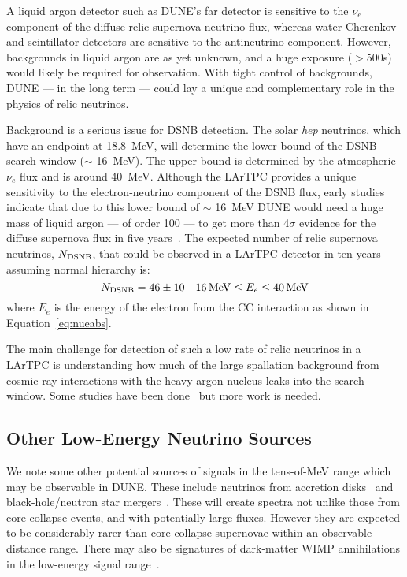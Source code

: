 A liquid argon detector such as DUNE's far detector is sensitive to
the $\nu_e$ component of the diffuse relic supernova neutrino flux,
whereas water Cherenkov and scintillator detectors are sensitive to
the antineutrino component.  However, backgrounds in liquid argon are as
yet unknown, and a huge exposure ($>$\SI{500}{\ktyr}s)
would likely be required for observation.  
With tight control of
backgrounds, 
DUNE --- in the long term --- could 
lay a unique and
 complementary role in the physics of relic neutrinos.


Background is a serious issue for DSNB detection.
The solar {\em hep} neutrinos, which have an                
endpoint at \SI{18.8}{\MeV}, will determine the lower bound of the DSNB
search window ($\sim$ \SI{16}{\MeV}).  The upper bound is determined
by the atmospheric ${\nu}_{e}$ flux and
is around \SI{40}{MeV}.
Although the LArTPC provides a unique sensitivity to the
electron-neutrino component of the DSNB flux, early studies indicate
that due to this lower bound of $\sim$ \SI{16}{\MeV} DUNE would need a huge
mass of liquid argon --- of order \SI{100}{\kt} --- to get more than 4$\sigma$
evidence for the diffuse supernova flux in five
years~\cite{Cocco:2004ac}.
%
The expected number of relic
supernova neutrinos, $N_{\rm DSNB}$, that could be observed in a
 LArTPC detector in ten years~\cite{Cocco:2004ac}
assuming normal hierarchy is:
\begin{equation}
N_{\rm DSNB} = 46 \pm 10  \ \ \ 16 \, {\rm MeV} \leq E_e \leq 40 \, {\rm MeV}
\label{eqn:srnrate}
\end{equation}
where $E_e$ is the energy of the electron from the CC interaction as
shown in Equation~\ref{eq:nueabs}. 

 The main challenge for detection of such
a low rate of relic neutrinos in a LArTPC is understanding how much of
the large spallation background from cosmic-ray interactions with the
heavy argon nucleus 
leaks into the search window.   Some studies have been done~\cite{Barker:2012nb} but more work is needed.

\subsection{Other Low-Energy Neutrino Sources}

We note some other potential sources of signals in the tens-of-MeV range which may be observable in DUNE.  These include neutrinos from accretion disks~\cite{Caballero:2011dw} and black-hole/neutron star mergers~\cite{Caballero:2009ww}.  These will create spectra not unlike those from core-collapse events, and with potentially large fluxes.  However they are expected to be considerably rarer than core-collapse supernovae within an observable distance range.  There may also be signatures of dark-matter WIMP annihilations in the low-energy signal range~\cite{Rott:2012qb, Bernal:2012qh}.



